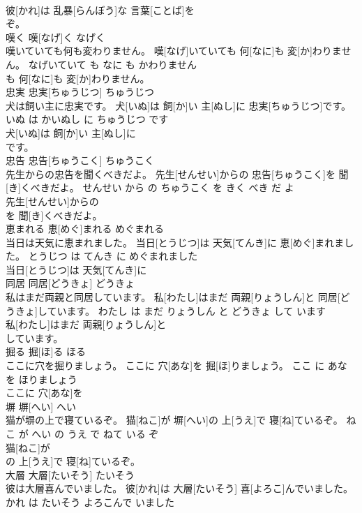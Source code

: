 \documentclass[8pt]{extreport}
\begin{document}
\begin{CJK}{UTF8}{min}
\\	彼[かれ]は 乱暴[らんぼう]な 言葉[ことば]を
\\	ぞ。			
\\	嘆く	嘆[なげ]く	なげく	
\\	嘆いていても何も変わりません。	嘆[なげ]いていても 何[なに]も 変[か]わりません。	なげいていて も なに も かわりません	
\\	も 何[なに]も 変[か]わりません。			
\\	忠実	忠実[ちゅうじつ]	ちゅうじつ	
\\	犬は飼い主に忠実です。	犬[いぬ]は 飼[か]い 主[ぬし]に 忠実[ちゅうじつ]です。	いぬ は かいぬし に ちゅうじつ です	
\\	犬[いぬ]は 飼[か]い 主[ぬし]に
\\	です。			
\\	忠告	忠告[ちゅうこく]	ちゅうこく	
\\	先生からの忠告を聞くべきだよ。	先生[せんせい]からの 忠告[ちゅうこく]を 聞[き]くべきだよ。	せんせい から の ちゅうこく を きく べき だ よ	
\\	先生[せんせい]からの
\\	を 聞[き]くべきだよ。			
\\	恵まれる	恵[めぐ]まれる	めぐまれる	
\\	当日は天気に恵まれました。	当日[とうじつ]は 天気[てんき]に 恵[めぐ]まれました。	とうじつ は てんき に めぐまれました	
\\	当日[とうじつ]は 天気[てんき]に
\\	同居	同居[どうきょ]	どうきょ	
\\	私はまだ両親と同居しています。	私[わたし]はまだ 両親[りょうしん]と 同居[どうきょ]しています。	わたし は まだ りょうしん と どうきょ して います	
\\	私[わたし]はまだ 両親[りょうしん]と
\\	しています。			
\\	掘る	掘[ほ]る	ほる	
\\	ここに穴を掘りましょう。	ここに 穴[あな]を 掘[ほ]りましょう。	ここ に あな を ほりましょう	
\\	ここに 穴[あな]を
\\	塀	塀[へい]	へい	
\\	猫が塀の上で寝ているぞ。	猫[ねこ]が 塀[へい]の 上[うえ]で 寝[ね]ているぞ。	ねこ が へい の うえ で ねて いる ぞ	
\\	猫[ねこ]が
\\	の 上[うえ]で 寝[ね]ているぞ。			
\\	大層	大層[たいそう]	たいそう	
\\	彼は大層喜んでいました。	彼[かれ]は 大層[たいそう] 喜[よろこ]んでいました。	かれ は たいそう よろこんで いました	

\end{CJK}
\end{document}
